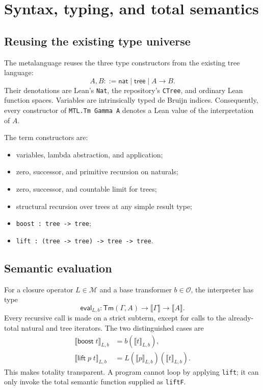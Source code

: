 \documentclass[11pt]{article}
\theoremstyle{definition}
\newcommand{\Op}{\mathcal{O}}
\newcommand{\MOp}{\mathcal{M}}
\newcommand{\code}[1]{\texttt{#1}}
\begin{document}
\section{Syntax, typing, and total semantics}

\subsection{Reusing the existing type universe}

The metalanguage reuses the three type constructors from the existing tree
language:
\[
  A,B ::= \mathsf{nat}\mid\mathsf{tree}\mid A\to B.
\]
Their denotations are Lean's \code{Nat}, the repository's \code{CTree}, and
ordinary Lean function spaces.  Variables are intrinsically typed de Bruijn
indices.  Consequently, every constructor of \code{MTL.Tm Gamma A} denotes a
Lean value of the interpretation of \(A\).

The term constructors are:
\begin{itemize}[leftmargin=2em]
  \item variables, lambda abstraction, and application;
  \item zero, successor, and primitive recursion on naturals;
  \item zero, successor, and countable limit for trees;
  \item structural recursion over trees at any simple result type;
  \item \code{boost : tree -> tree};
  \item \code{lift : (tree -> tree) -> tree -> tree}.
\end{itemize}

\subsection{Semantic evaluation}

For a closure operator \(L\in\MOp\) and a base transformer \(b\in\Op\), the
interpreter has type
\[
  \mathsf{eval}_{L,b} : \mathsf{Tm}(\Gamma,A)
      \to \llbracket\Gamma\rrbracket\to\llbracket A\rrbracket.
\]
Every recursive call is made on a strict subterm, except for calls to the
already-total natural and tree iterators.  The two distinguished cases are
\[
\begin{aligned}
  \llbracket\mathsf{boost}\;t\rrbracket_{L,b}
    &= b(\llbracket t\rrbracket_{L,b}),\\
  \llbracket\mathsf{lift}\;p\;t\rrbracket_{L,b}
    &= L(\llbracket p\rrbracket_{L,b})
         (\llbracket t\rrbracket_{L,b}).
\end{aligned}
\]
This makes totality transparent.  A program cannot loop by applying
\code{lift}; it can only invoke the total semantic function supplied as
\code{liftF}.
\end{document}
